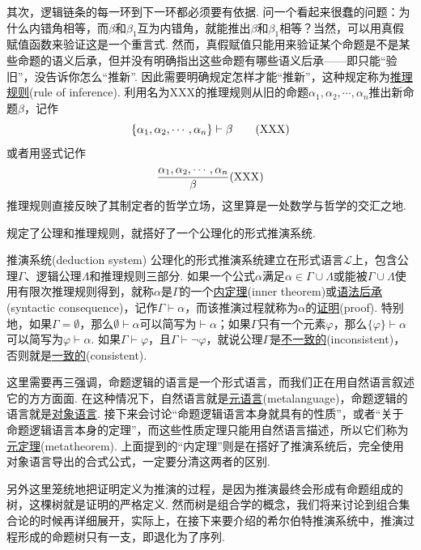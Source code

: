 \documentclass[main.tex]{subfiles}
\begin{document}
其次，逻辑链条的每一环到下一环都必须要有依据. 问一个看起来很蠢的问题：为什么内错角相等，而\(\beta\)和\(\beta_1\)互为内错角，就能推出\(\beta\)和\(\beta_1\)相等？当然，可以用真假赋值函数来验证这是一个重言式. 然而，真假赋值只能用来验证某个命题是不是某些命题的语义后承，但并没有明确指出这些命题有哪些语义后承——即只能“验旧”，没告诉你怎么“推新”. 因此需要明确规定怎样才能“推新”，这种规定称为\uline{推理规则}(rule of inference). 利用名为XXX的推理规则从旧的命题\(\alpha_1, \alpha_2, \cdots, \alpha_n\)推出新命题\(\beta\)，记作
\[\{\alpha_1, \alpha_2, \cdots, \alpha_n\} \vdash \beta \qquad ({\rm XXX})\]
或者用竖式记作
\[{{\alpha_1, \alpha_2, \cdots, \alpha_n} \over {\beta}} ({\rm XXX})\]
推理规则直接反映了其制定者的哲学立场，这里算是一处数学与哲学的交汇之地.

规定了公理和推理规则，就搭好了一个公理化的形式推演系统.

\begin{definition}{推演系统(deduction system)}
    公理化的形式推演系统建立在形式语言\(\mathcal{L}\)上，包含公理\(\Gamma\)、逻辑公理\(\Lambda\)和推理规则三部分. 如果一个公式\(\alpha\)满足\(\alpha \in \Gamma \cup \Lambda\)或能被\(\Gamma \cup \Lambda\)使用有限次推理规则得到，就称\(\alpha\)是\(\Gamma\)的一个\uline{内定理}(inner theorem)或\uline{语法后承}(syntactic consequence)，记作\(\Gamma \vdash \alpha\)，而该推演过程就称为\(\alpha\)的\uline{证明}(proof). \newline
    特别地，如果\(\Gamma=\emptyset\)，那么\(\emptyset \vdash \alpha\)可以简写为\(\vdash \alpha\)；如果\(\Gamma\)只有一个元素\(\varphi\)，那么\(\{\varphi\} \vdash \alpha\)可以简写为\(\varphi \vdash \alpha\). \newline
    如果\(\Gamma \vdash \varphi\)，且\(\Gamma \vdash \neg \varphi\)，就说公理\(\Gamma\)是\uline{不一致的}(inconsistent)，否则就是\uline{一致的}(consistent). 
\end{definition}

这里需要再三强调，命题逻辑的语言是一个形式语言，而我们正在用自然语言叙述它的方方面面. 在这种情况下，自然语言就是\uline{元语言}(metalanguage)，命题逻辑的语言就是\uline{对象语言}. 接下来会讨论“命题逻辑语言本身就具有的性质”，或者“关于命题逻辑语言本身的定理”，而这些性质定理只能用自然语言描述，所以它们称为\uline{元定理}(metatheorem). 上面提到的“内定理”则是在搭好了推演系统后，完全使用对象语言导出的合式公式，一定要分清这两者的区别. 

另外这里笼统地把证明定义为推演的过程，是因为推演最终会形成有命题组成的树，这棵树就是证明的严格定义. 然而树是组合学的概念，我们将来讨论到组合集合论的时候再详细展开，实际上，在接下来要介绍的希尔伯特推演系统中，推演过程形成的命题树只有一支，即退化为了序列. 
\end{document}
